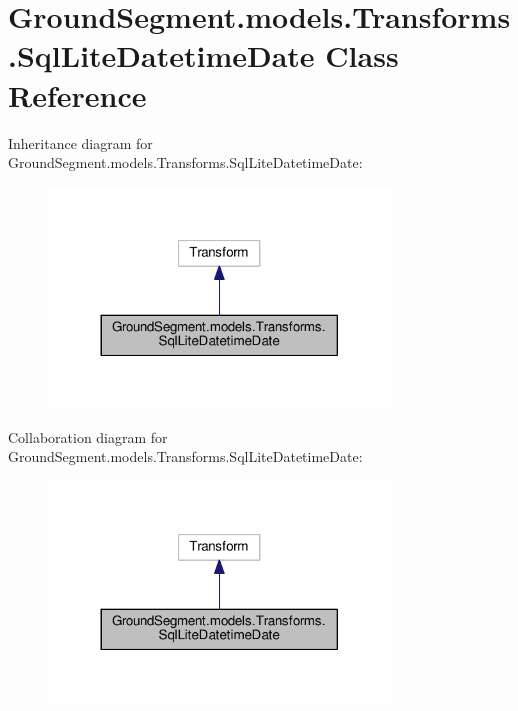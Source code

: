 \hypertarget{class_ground_segment_1_1models_1_1_transforms_1_1_sql_lite_datetime_date}{}\section{Ground\+Segment.\+models.\+Transforms.\+Sql\+Lite\+Datetime\+Date Class Reference}
\label{class_ground_segment_1_1models_1_1_transforms_1_1_sql_lite_datetime_date}


Inheritance diagram for Ground\+Segment.\+models.\+Transforms.\+Sql\+Lite\+Datetime\+Date\+:\nopagebreak
\begin{figure}[H]
\begin{center}
\leavevmode
\includegraphics[width=257pt]{class_ground_segment_1_1models_1_1_transforms_1_1_sql_lite_datetime_date__inherit__graph}
\end{center}
\end{figure}


Collaboration diagram for Ground\+Segment.\+models.\+Transforms.\+Sql\+Lite\+Datetime\+Date\+:\nopagebreak
\begin{figure}[H]
\begin{center}
\leavevmode
\includegraphics[width=257pt]{class_ground_segment_1_1models_1_1_transforms_1_1_sql_lite_datetime_date__coll__graph}
\end{center}
\end{figure}
